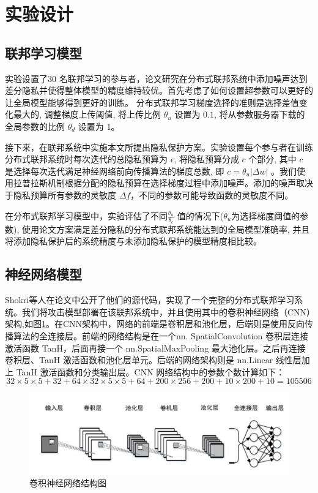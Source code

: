 \section{实验设计}
\subsection{联邦学习模型}
实验设置了30 名联邦学习的参与者，论文研究在分布式联邦系统中添加噪声达到差分隐私并使得整体模型的精度维持较优。首先考虑了如何设置超参数可以更好的让全局模型能够得到更好的训练。
分布式联邦学习梯度选择的准则是选择差值变化最大的, 调整梯度上传阈值, 将上传比例 $\theta_{u}$ 设置为 $0.1$, 将从参数服务器下载的全局参数的比例 $\theta_{d}$ 设置为 1。

接下来，在联邦系统中实施本文所提出隐私保护方案。实验设置每个参与者在训练分布式联邦系统时每次迭代的总隐私预算为 $\epsilon$, 将隐私预算分成 $c$ 个部分, 其中 $c$ 是选择每次迭代满足神经网络前向传播算法的梯度总数, 即 $c=\theta_{u}|\Delta w|$ 。我们使用拉普拉斯机制根据分配的隐私预算在选择梯度过程中添加噪声。添加的噪声取决于隐私预算所有参数的灵敏度 $\Delta f$，不同的参数可能导致函数的灵敏度不同。 

在分布式联邦学习模型中，实验评估了不同$\frac{\theta_{u}}{\theta_{c}}$ 值的情况下($\theta_{u}$为选择梯度阈值的参数), 使用论文方案满足差分隐私的分布式联邦系统能达到的全局模型准确率, 并且将添加隐私保护后的系统精度与未添加隐私保护的模型精度相比较。

\subsection{神经网络模型}
Shokri等人在论文中公开了他们的源代码，实现了一个完整的分布式联邦学习系统。我们将攻击模型部署在该联邦系统中，并且使用其中的卷积神经网络（CNN）架构,如图\ref{fig:卷积神经网络结构图}。在CNN架构中，网络的前端是卷积层和池化层，后端则是使用反向传播算法的全连接层。前端的网络结构是在一个nn. SpatialConvolution 卷积层连接激活函数 TanH，后面再接一个 nn.SpatialMaxPooling 最大池化层。之后再连接卷积层、TanH 激活函数和池化层单元。后端的网络架构则是 nn.Linear 线性层加上 TanH 激活函数和分类输出层。CNN 网络结构中的参数个数计算如下：
$$
32×5×5 + 32 + 64×32×5×5 + 64 + 200×256 + 200 + 10×200 + 10 = 105506
$$

\begin{figure}[!hbt]
\centering
  	\includegraphics[scale=0.6]{fig2/C5/CNN结构}%
	\caption{卷积神经网络结构图}
  	\label{fig:卷积神经网络结构图} 
\end{figure}

